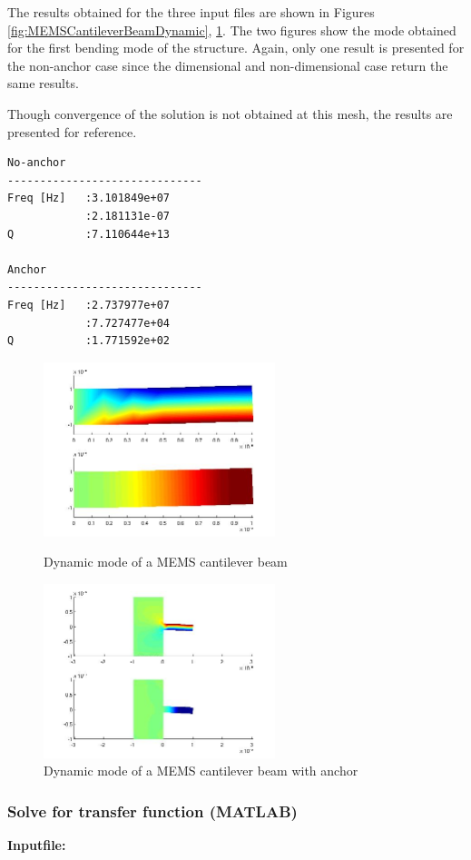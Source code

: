 The results obtained for the three input files are shown in 
Figures 
\ref{fig:MEMSCantileverBeamDynamic},
\ref{fig:MEMSCantileverBeamWaDynamic}.
The two figures show the mode obtained for the first bending mode
of the structure. 
Again, only one result is presented for the non-anchor case since
the dimensional and non-dimensional case return the same 
results. 

Though convergence of the solution is not obtained at this
mesh, the results are presented for reference.
\begin{verbatim}
No-anchor
------------------------------
Freq [Hz]   :3.101849e+07
            :2.181131e-07
Q           :7.110644e+13

Anchor
------------------------------
Freq [Hz]   :2.737977e+07
            :7.727477e+04
Q           :1.771592e+02
\end{verbatim}

\begin{figure}
\centering
\includegraphics[height = 2in]{fig/mems_cant_m_dyn.jpg}
\caption{Dynamic mode of a MEMS cantilever beam}
\label{fig:MEMSCantileverBeamDynamic}
\includegraphics[height = 2in]{fig/mems_cant_wa_m_dyn.jpg}
\caption{Dynamic mode of a MEMS cantilever beam with anchor}
\label{fig:MEMSCantileverBeamWaDynamic}
\end{figure}


\clearpage
\subsubsection*{Solve for transfer function (MATLAB)}
\begin{flushleft}
  \textbf{Inputfile:}
  \\
\end{flushleft}
\hspace{1in}
{\footnotesize
{}
}

